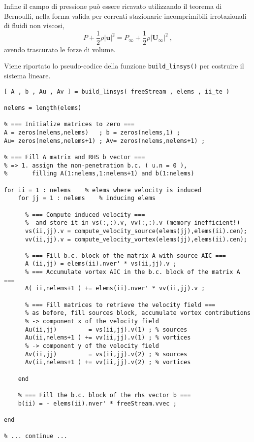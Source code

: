 \noindent
Infine il campo di pressione può essere ricavato utilizzando il teorema di Bernoulli, nella forma valida per correnti stazionarie incomprimibili irrotazionali di fluidi non viscosi,
\begin{equation}
 P + \dfrac{1}{2} \rho |\bm{u}|^2 = P_{\infty} + \dfrac{1}{2} \rho |\bm{U}_{\infty}|^2 \ ,
\end{equation}
avendo trascurato le forze di volume.

\newpage
\noindent
Viene riportato lo pseudo-codice della funzione \texttt{build\_linsys()} per costruire il sistema lineare.

\begin{tcolorbox}
\begin{verbatim}
[ A , b , Au , Av ] = build_linsys( freeStream , elems , ii_te )

nelems = length(elems)

% === Initialize matrices to zero ===
A = zeros(nelems,nelems)   ; b = zeros(nelems,1) ;
Au= zeros(nelems,nelems+1) ; Av= zeros(nelems,nelems+1) ;

% === Fill A matrix and RHS b vector ===
% => 1. assign the non-penetration b.c. ( u.n = 0 ),
%       filling A(1:nelems,1:nelems+1) and b(1:nelems)

for ii = 1 : nelems    % elems where velocity is induced
    for jj = 1 : nelems    % inducing elems

      % === Compute induced velocity ===
      %  and store it in vs(:,:).v, vv(:,:).v (memory inefficient!)
      vs(ii,jj).v = compute_velocity_source(elems(jj),elems(ii).cen);
      vv(ii,jj).v = compute_velocity_vortex(elems(jj),elems(ii).cen);

      % === Fill b.c. block of the matrix A with source AIC ===
      A (ii,jj) = elems(ii).nver' * vs(ii,jj).v ;
      % === Accumulate vortex AIC in the b.c. block of the matrix A === 
      A( ii,nelems+1 ) += elems(ii).nver' * vv(ii,jj).v ; 

      % === Fill matrices to retrieve the velocity field ===
      % as before, fill sources block, accumulate vortex contributions
      % -> component x of the velocity field
      Au(ii,jj)         = vs(ii,jj).v(1) ; % sources
      Au(ii,nelems+1 ) += vv(ii,jj).v(1) ; % vortices
      % -> component y of the velocity field
      Av(ii,jj)         = vs(ii,jj).v(2) ; % sources
      Av(ii,nelems+1 ) += vv(ii,jj).v(2) ; % vortices

    end

    % === Fill the b.c. block of the rhs vector b ===
    b(ii) = - elems(ii).nver' * freeStream.vvec ;

end

% ... continue ...
\end{verbatim}
\end{tcolorbox}


